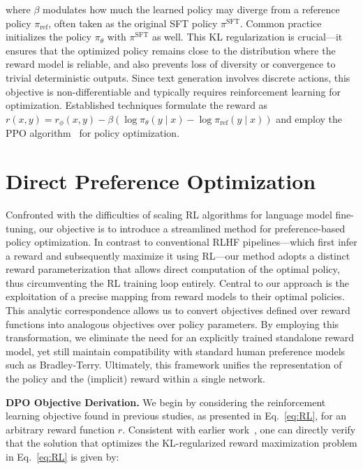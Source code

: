 where $\beta$ modulates how much the learned policy may diverge from a reference policy $\pi_\text{ref}$, often taken as the original SFT policy $\pi^\text{SFT}$. Common practice initializes the policy $\pi_\theta$ with $\pi^\text{SFT}$ as well. This KL regularization is crucial—it ensures that the optimized policy remains close to the distribution where the reward model is reliable, and also prevents loss of diversity or convergence to trivial deterministic outputs. Since text generation involves discrete actions, this objective is non-differentiable and typically requires reinforcement learning for optimization. Established techniques \citep{ziegler2020finetuning, stiennon2022learning, bai2022training, ouyang2022training} formulate the reward as ${r(x, y) = r_{\phi}(x, y) -\beta (\log \pi_{\theta}(y\mid x) - \log \pi_\text{ref}(y\mid x))}$ and employ the PPO algorithm~\cite{schulman2017proximal} for policy optimization.

\section{Direct Preference Optimization}\label{sec:DPO}

Confronted with the difficulties of scaling RL algorithms for language model fine-tuning, our objective is to introduce a streamlined method for preference-based policy optimization. In contrast to conventional RLHF pipelines—which first infer a reward and subsequently maximize it using RL—our method adopts a distinct reward parameterization that allows direct computation of the optimal policy, thus circumventing the RL training loop entirely. Central to our approach is the exploitation of a precise mapping from reward models to their optimal policies. This analytic correspondence allows us to convert objectives defined over reward functions into analogous objectives over policy parameters. By employing this transformation, we eliminate the need for an explicitly trained standalone reward model, yet still maintain compatibility with standard human preference models such as Bradley-Terry. Ultimately, this framework unifies the representation of the policy and the (implicit) reward within a single network.

\textbf{DPO Objective Derivation.} We begin by considering the reinforcement learning objective found in previous studies, as presented in Eq.~\ref{eq:RL}, for an arbitrary reward function $r$. Consistent with earlier work~\citep{peters2007reinforcement, peng2019advantage, korbak2022reinforcement, go2023aligning}, one can directly verify that the solution that optimizes the KL-regularized reward maximization problem in Eq.~\ref{eq:RL} is given by:

